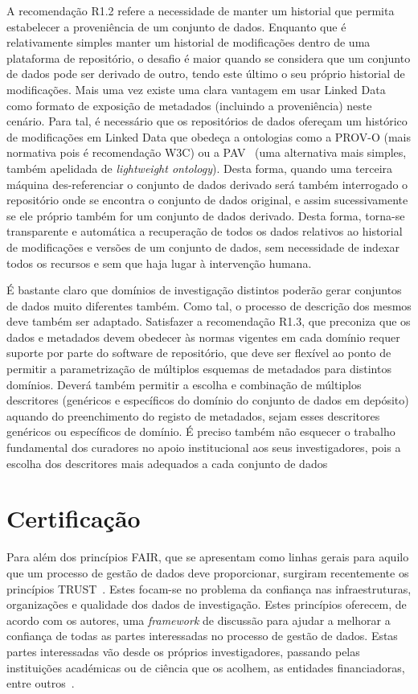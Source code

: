 \documentclass[sigconf,nonacm]{acmart}
\begin{document}
A recomendação R1.2 refere a necessidade de manter um historial que permita estabelecer a proveniência de um conjunto de dados. Enquanto que é relativamente simples manter um historial de modificações dentro de uma plataforma de repositório, o desafio é maior quando se considera que um conjunto de dados pode ser derivado de outro, tendo este último o seu próprio historial de modificações. Mais uma vez existe uma clara vantagem em usar Linked Data como formato de exposição de metadados (incluindo a proveniência) neste cenário. Para tal, é necessário que os repositórios de dados ofereçam um histórico de modificações em Linked Data que obedeça a ontologias como a PROV-O\cite{lebo2013prov} (mais normativa pois é recomendação W3C) ou a PAV~\cite{ciccarese2013pav} (uma alternativa mais simples, também apelidada de \emph{lightweight ontology}). Desta forma, quando uma terceira máquina des-referenciar o conjunto de dados derivado será também interrogado o repositório onde se encontra o conjunto de dados original, e assim sucessivamente se ele próprio também for um conjunto de dados derivado. Desta forma, torna-se transparente e automática a recuperação de todos os dados relativos ao historial de modificações e versões de um conjunto de dados, sem necessidade de indexar todos os recursos e sem que haja lugar à intervenção humana.

É bastante claro que domínios de investigação distintos poderão gerar conjuntos de dados muito diferentes também. Como tal, o processo de descrição dos mesmos deve também ser adaptado. Satisfazer a recomendação R1.3, que preconiza que os dados e metadados devem obedecer às normas vigentes em cada domínio requer suporte por parte do software de repositório, que deve ser flexível ao ponto de permitir a parametrização de múltiplos esquemas de metadados para distintos domínios. Deverá também permitir a escolha e combinação de múltiplos descritores (genéricos e específicos do domínio do conjunto de dados em depósito) aquando do preenchimento do registo de metadados, sejam esses descritores genéricos ou específicos de domínio. É preciso também não esquecer o trabalho fundamental dos curadores no apoio institucional aos seus investigadores, pois a escolha dos descritores mais adequados a cada conjunto de dados

\section{Certificação}

Para além dos princípios FAIR, que se apresentam como linhas gerais para aquilo que um processo de gestão de dados deve proporcionar, surgiram recentemente os princípios TRUST~\cite{TRUSTprinciples}. Estes focam-se no problema da confiança nas infraestruturas, organizações e qualidade dos dados de investigação. Estes princípios oferecem, de acordo com os autores, uma \emph{framework} de discussão para ajudar a melhorar a confiança de todas as partes interessadas no processo de gestão de dados. Estas partes interessadas vão desde os próprios investigadores, passando pelas instituições académicas ou de ciência que os acolhem, as entidades financiadoras, entre outros~\cite{DCC_stakeholders}. 
\end{document}
